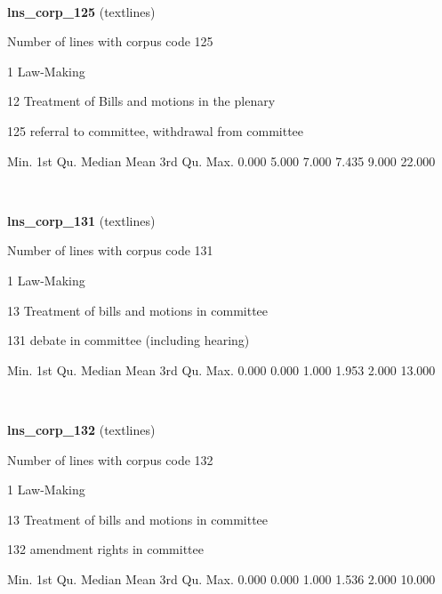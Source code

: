 \documentclass[]{article}
\newenvironment{Shaded}{\begin{snugshade}}{\end{snugshade}}
\newcommand{\FloatTok}[1]{\textcolor[rgb]{0.00,0.00,0.81}{{#1}}}
\newcommand{\NormalTok}[1]{{#1}}
\begin{document}
~

\vspace{1em}

\textbf{lns\_corp\_125} (textlines)

Number of lines with corpus code 125

1 Law-Making

12 Treatment of Bills and motions in the plenary

125 referral to committee, withdrawal from committee

\begin{Shaded}
\begin{Highlighting}[]
   \NormalTok{Min. 1st Qu.  Median    Mean 3rd Qu.    Max. }
  \FloatTok{0.000}   \FloatTok{5.000}   \FloatTok{7.000}   \FloatTok{7.435}   \FloatTok{9.000}  \FloatTok{22.000} 
\end{Highlighting}
\end{Shaded}

~

\vspace{1em}

\textbf{lns\_corp\_131} (textlines)

Number of lines with corpus code 131

1 Law-Making

13 Treatment of bills and motions in committee

131 debate in committee (including hearing)

\begin{Shaded}
\begin{Highlighting}[]
   \NormalTok{Min. 1st Qu.  Median    Mean 3rd Qu.    Max. }
  \FloatTok{0.000}   \FloatTok{0.000}   \FloatTok{1.000}   \FloatTok{1.953}   \FloatTok{2.000}  \FloatTok{13.000} 
\end{Highlighting}
\end{Shaded}

~

\vspace{1em}

\textbf{lns\_corp\_132} (textlines)

Number of lines with corpus code 132

1 Law-Making

13 Treatment of bills and motions in committee

132 amendment rights in committee

\begin{Shaded}
\begin{Highlighting}[]
   \NormalTok{Min. 1st Qu.  Median    Mean 3rd Qu.    Max. }
  \FloatTok{0.000}   \FloatTok{0.000}   \FloatTok{1.000}   \FloatTok{1.536}   \FloatTok{2.000}  \FloatTok{10.000} 
\end{Highlighting}
\end{Shaded}
\end{document}
